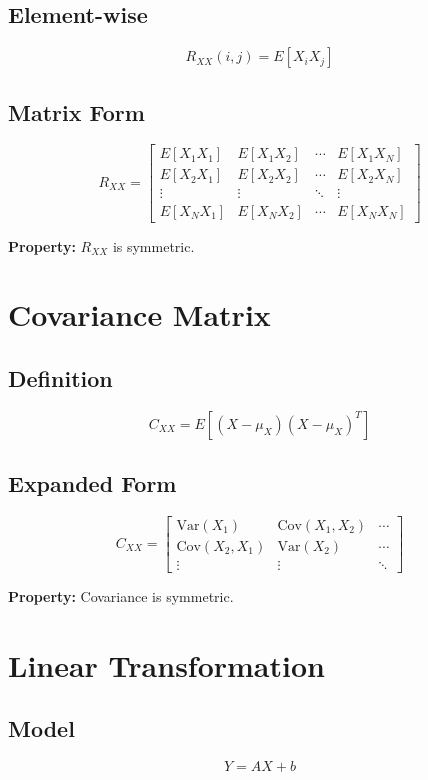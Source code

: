 \documentclass{article}
\begin{document}
\subsection{Element-wise}
\[
R_{XX}(i,j) = E[X_i X_j]
\]

\subsection{Matrix Form}
\[
R_{XX} =
\begin{bmatrix}
E[X_1X_1] & E[X_1X_2] & \cdots & E[X_1X_N] \\
E[X_2X_1] & E[X_2X_2] & \cdots & E[X_2X_N] \\
\vdots & \vdots & \ddots & \vdots \\
E[X_NX_1] & E[X_NX_2] & \cdots & E[X_NX_N]
\end{bmatrix}
\]

\textbf{Property:} $R_{XX}$ is symmetric.

\section{Covariance Matrix}

\subsection{Definition}
\[
C_{XX} = E[(X - \mu_X)(X - \mu_X)^T]
\]

\subsection{Expanded Form}
\[
C_{XX} =
\begin{bmatrix}
\mathrm{Var}(X_1) & \mathrm{Cov}(X_1,X_2) & \cdots \\
\mathrm{Cov}(X_2,X_1) & \mathrm{Var}(X_2) & \cdots \\
\vdots & \vdots & \ddots
\end{bmatrix}
\]

\textbf{Property:} Covariance is symmetric.

\section{Linear Transformation}

\subsection{Model}
\[
Y = AX + b
\]
\end{document}
